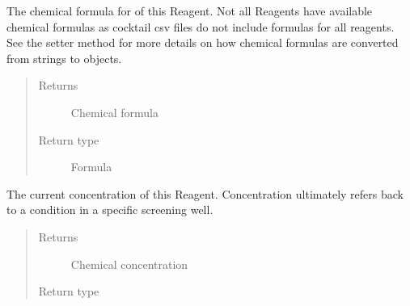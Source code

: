 \documentclass[letterpaper,10pt,english]{sphinxmanual}
\begin{document}
\begin{fulllineitems}
\begin{quote}
\begin{description}
\begin{itemize}
\end{itemize}

\end{description}\end{quote}

\begin{fulllineitems}
\label{\detokenize{polo.crystallography:polo.crystallography.cocktail.Reagent.chemical_formula}}
The chemical formula for of this Reagent. Not all
Reagents have available chemical formulas as cocktail csv files do not
include formulas for all reagents. See the setter method for more details
on how chemical formulas are converted from strings to  objects.
\begin{quote}\begin{description}
\item[{Returns}] \leavevmode
Chemical formula

\item[{Return type}] \leavevmode
Formula

\end{description}\end{quote}

\end{fulllineitems}


\begin{fulllineitems}
\label{\detokenize{polo.crystallography:polo.crystallography.cocktail.Reagent.concentration}}
The current concentration of this Reagent. Concentration
ultimately refers back to a condition in a specific screening well.
\begin{quote}\begin{description}
\item[{Returns}] \leavevmode
Chemical concentration

\item[{Return type}] \leavevmode
{\hyperref[\detokenize{polo.crystallography:polo.crystallography.cocktail.UnitValue}]{}}


\end{description}
\end{quote}
\end{fulllineitems}
\end{fulllineitems}
\end{document}
